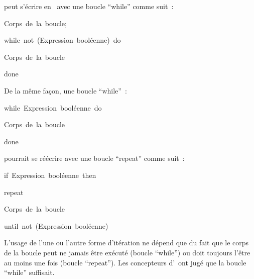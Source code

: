{\begin{minipage}{\myparboxwidth}
{\medskip }

\noindent peut s'écrire en \ocaml\ avec une boucle ``while'' comme suit~:
{
\parindent {}
\medskip

\mbox{\blc  \blk\small\rm Corps de la boucle$;$}\par
\mbox{\blc  \blk\mcl while\ not\ \idt (\small\rm Expression booléenne\idt )\ \mcl do}\par
\mbox{\blc  \blk\blk\small\rm Corps de la boucle}\par
\mbox{\blc  \blk\mcl done}\par

\medskip }

\noindent  De la même façon, une boucle ``while''~:

{
\parindent {}
\medskip

\mbox{\blc  \blk\mcl while\ \small\rm Expression booléenne\ \mcl do}\par
\mbox{\blc  \blk\blk\small\rm Corps de la boucle}\par
\mbox{\blc  \blk\mcl done}\par

\medskip }

\noindent pourrait se réécrire avec une boucle ``repeat'' comme suit~:

{
\parindent {}
\medskip

\mbox{\blc  \blk\mcl if\ \small\rm Expression booléenne\ \mcl then}\par
\mbox{\blc  \blk\blk\mcl repeat}\par
\mbox{\blc  \blk\blk\blk\small\rm Corps de la boucle}\par
\mbox{\blc  \blk\blk\mcl until\ not\ \idt (\small\rm Expression booléenne\idt )}\par

\medskip }

L'usage de l'une ou l'autre forme d'itération ne dépend que du fait que le corps de la boucle
peut ne jamais être exécuté (boucle ``while'') ou doit toujours l'être au moins une fois
(boucle ``repeat''). Les concepteurs d'\ocaml\ ont jugé que la boucle ``while'' suffisait.

\vspace{\abovedisplayskip}
\end{minipage}
}
